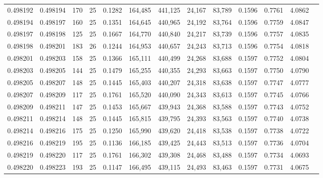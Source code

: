 \begin{tabular}{rrrrrrrrrrrrr}
0.498192 & 0.498194 & 170 &  25 &                                     0.1282 & 164,485 & 441,125 &  24,167 &  83,789 & 0.1596 & 0.7761 & 4.0862 \\
0.498194 & 0.498197 & 160 &  25 &                                     0.1351 & 164,645 & 440,965 &  24,192 &  83,764 & 0.1596 & 0.7759 & 4.0847 \\
0.498197 & 0.498198 & 125 &  25 &                                     0.1667 & 164,770 & 440,840 &  24,217 &  83,739 & 0.1596 & 0.7757 & 4.0835 \\
0.498198 & 0.498201 & 183 &  26 &                                     0.1244 & 164,953 & 440,657 &  24,243 &  83,713 & 0.1596 & 0.7754 & 4.0818 \\
0.498201 & 0.498203 & 158 &  25 &                                     0.1366 & 165,111 & 440,499 &  24,268 &  83,688 & 0.1597 & 0.7752 & 4.0804 \\
0.498203 & 0.498205 & 144 &  25 &                                     0.1479 & 165,255 & 440,355 &  24,293 &  83,663 & 0.1597 & 0.7750 & 4.0790 \\
0.498205 & 0.498207 & 148 &  25 &                                     0.1445 & 165,403 & 440,207 &  24,318 &  83,638 & 0.1597 & 0.7747 & 4.0777 \\
0.498207 & 0.498209 & 117 &  25 &                                     0.1761 & 165,520 & 440,090 &  24,343 &  83,613 & 0.1597 & 0.7745 & 4.0766 \\
0.498209 & 0.498211 & 147 &  25 &                                     0.1453 & 165,667 & 439,943 &  24,368 &  83,588 & 0.1597 & 0.7743 & 4.0752 \\
0.498211 & 0.498214 & 148 &  25 &                                     0.1445 & 165,815 & 439,795 &  24,393 &  83,563 & 0.1597 & 0.7740 & 4.0738 \\
0.498214 & 0.498216 & 175 &  25 &                                     0.1250 & 165,990 & 439,620 &  24,418 &  83,538 & 0.1597 & 0.7738 & 4.0722 \\
0.498216 & 0.498219 & 195 &  25 &                                     0.1136 & 166,185 & 439,425 &  24,443 &  83,513 & 0.1597 & 0.7736 & 4.0704 \\
0.498219 & 0.498220 & 117 &  25 &                                     0.1761 & 166,302 & 439,308 &  24,468 &  83,488 & 0.1597 & 0.7734 & 4.0693 \\
0.498220 & 0.498223 & 193 &  25 &                                     0.1147 & 166,495 & 439,115 &  24,493 &  83,463 & 0.1597 & 0.7731 & 4.0675 \\

\end{tabular}
